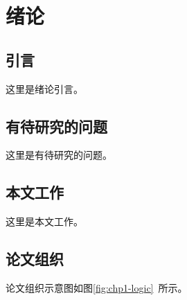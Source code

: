 \chapter{绪论}\label{chp:intro}
\section{引言}\label{sec:intro}
这里是绪论引言。
\section{有待研究的问题}\label{sec:problems}
这里是有待研究的问题。
\section{本文工作}\label{sec:works}
这里是本文工作。
\section{论文组织}\label{sec:problems}
论文组织示意图如图\ref{fig:chp1-logic}~所示。
